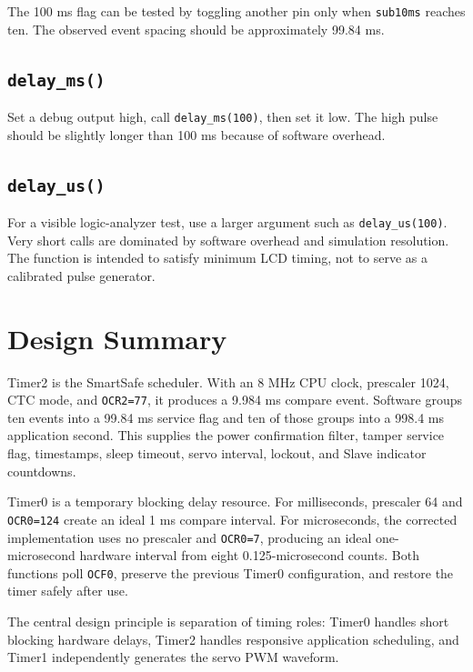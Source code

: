\documentclass[11pt,a4paper]{article}
\begin{document}
The 100 ms flag can be tested by toggling another pin only when \texttt{sub10ms} reaches ten. The observed event spacing should be approximately 99.84 ms.

\subsection{\texttt{delay\_ms()}}
Set a debug output high, call \texttt{delay\_ms(100)}, then set it low. The high pulse should be slightly longer than 100 ms because of software overhead.

\subsection{\texttt{delay\_us()}}
For a visible logic-analyzer test, use a larger argument such as \texttt{delay\_us(100)}. Very short calls are dominated by software overhead and simulation resolution. The function is intended to satisfy minimum LCD timing, not to serve as a calibrated pulse generator.

\section{Design Summary}
Timer2 is the SmartSafe scheduler. With an 8 MHz CPU clock, prescaler 1024, CTC mode, and \texttt{OCR2=77}, it produces a 9.984 ms compare event. Software groups ten events into a 99.84 ms service flag and ten of those groups into a 998.4 ms application second. This supplies the power confirmation filter, tamper service flag, timestamps, sleep timeout, servo interval, lockout, and Slave indicator countdowns.

Timer0 is a temporary blocking delay resource. For milliseconds, prescaler 64 and \texttt{OCR0=124} create an ideal 1 ms compare interval. For microseconds, the corrected implementation uses no prescaler and \texttt{OCR0=7}, producing an ideal one-microsecond hardware interval from eight 0.125-microsecond counts. Both functions poll \texttt{OCF0}, preserve the previous Timer0 configuration, and restore the timer safely after use.

The central design principle is separation of timing roles: Timer0 handles short blocking hardware delays, Timer2 handles responsive application scheduling, and Timer1 independently generates the servo PWM waveform.
\end{document}
